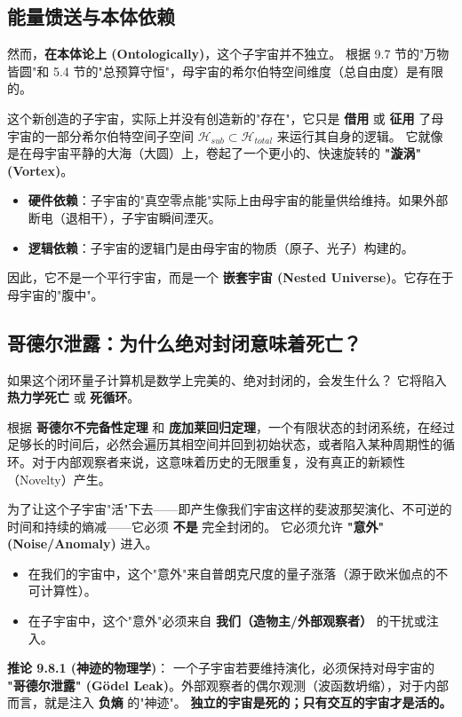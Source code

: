\subsection{能量馈送与本体依赖}

然而，\textbf{在本体论上 (Ontologically)}，这个子宇宙并不独立。
根据 9.7 节的"万物皆圆"和 5.4 节的"总预算守恒"，母宇宙的希尔伯特空间维度（总自由度）是有限的。

这个新创造的子宇宙，实际上并没有创造新的"存在"，它只是 \textbf{借用} 或 \textbf{征用} 了母宇宙的一部分希尔伯特空间子空间 $\mathcal{H}_{sub} \subset \mathcal{H}_{total}$ 来运行其自身的逻辑。
它就像是在母宇宙平静的大海（大圆）上，卷起了一个更小的、快速旋转的 \textbf{"漩涡" (Vortex)}。

\begin{itemize}
\item \textbf{硬件依赖}：子宇宙的"真空零点能"实际上由母宇宙的能量供给维持。如果外部断电（退相干），子宇宙瞬间湮灭。
\item \textbf{逻辑依赖}：子宇宙的逻辑门是由母宇宙的物质（原子、光子）构建的。
\end{itemize}

因此，它不是一个平行宇宙，而是一个 \textbf{嵌套宇宙 (Nested Universe)}。它存在于母宇宙的"腹中"。

\subsection{哥德尔泄露：为什么绝对封闭意味着死亡？}

如果这个闭环量子计算机是数学上完美的、绝对封闭的，会发生什么？
它将陷入 \textbf{热力学死亡} 或 \textbf{死循环}。

根据 \textbf{哥德尔不完备性定理} 和 \textbf{庞加莱回归定理}，一个有限状态的封闭系统，在经过足够长的时间后，必然会遍历其相空间并回到初始状态，或者陷入某种周期性的循环。对于内部观察者来说，这意味着历史的无限重复，没有真正的新颖性（Novelty）产生。

为了让这个子宇宙"活"下去——即产生像我们宇宙这样的斐波那契演化、不可逆的时间和持续的熵减——它必须 \textbf{不是} 完全封闭的。
它必须允许 \textbf{"意外" (Noise/Anomaly)} 进入。
\begin{itemize}
\item 在我们的宇宙中，这个"意外"来自普朗克尺度的量子涨落（源于欧米伽点的不可计算性）。
\item 在子宇宙中，这个"意外"必须来自 \textbf{我们（造物主/外部观察者）} 的干扰或注入。
\end{itemize}

\textbf{推论 9.8.1 (神迹的物理学)}：
一个子宇宙若要维持演化，必须保持对母宇宙的 \textbf{"哥德尔泄露" (Gödel Leak)}。外部观察者的偶尔观测（波函数坍缩），对于内部而言，就是注入 \textbf{负熵} 的"神迹"。
\textbf{独立的宇宙是死的；只有交互的宇宙才是活的。}

